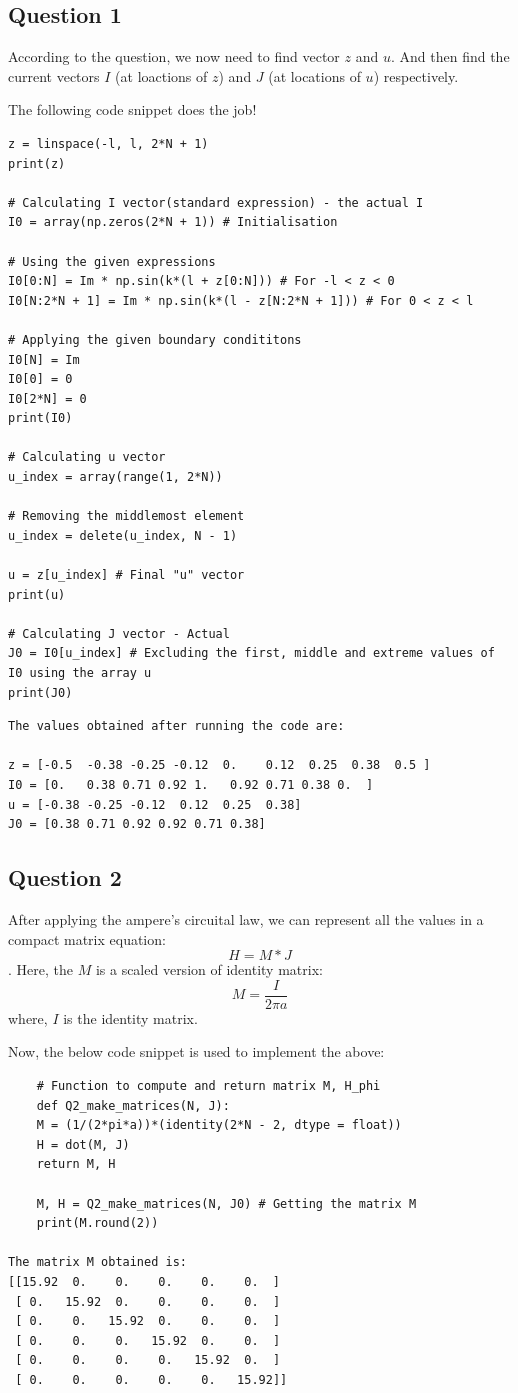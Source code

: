\documentclass{article}
\begin{document}
\subsection{Question 1}
According to the question, we now need to find vector $z$ and $u$. And then find the current vectors $I$ (at loactions of $z$) and $J$ (at locations of $u$) respectively.

\newline The following code snippet does the job!
\begin{verbatim}
z = linspace(-l, l, 2*N + 1)
print(z)

# Calculating I vector(standard expression) - the actual I
I0 = array(np.zeros(2*N + 1)) # Initialisation

# Using the given expressions
I0[0:N] = Im * np.sin(k*(l + z[0:N])) # For -l < z < 0
I0[N:2*N + 1] = Im * np.sin(k*(l - z[N:2*N + 1])) # For 0 < z < l 

# Applying the given boundary condititons
I0[N] = Im
I0[0] = 0
I0[2*N] = 0 
print(I0)

# Calculating u vector
u_index = array(range(1, 2*N))

# Removing the middlemost element
u_index = delete(u_index, N - 1)

u = z[u_index] # Final "u" vector
print(u)

# Calculating J vector - Actual
J0 = I0[u_index] # Excluding the first, middle and extreme values of I0 using the array u
print(J0)
\end{verbatim}
\begin{verbatim}
The values obtained after running the code are:

z = [-0.5  -0.38 -0.25 -0.12  0.    0.12  0.25  0.38  0.5 ]
I0 = [0.   0.38 0.71 0.92 1.   0.92 0.71 0.38 0.  ]
u = [-0.38 -0.25 -0.12  0.12  0.25  0.38]
J0 = [0.38 0.71 0.92 0.92 0.71 0.38]

\end{verbatim}


\subsection{Question 2}
After applying the ampere's circuital law, we can represent all the values in a compact matrix equation: $$H=M*J$$ .
Here, the $M$ is a scaled version of identity matrix: $$M = \frac{I}{2\pi a}$$
where, $I$ is the identity matrix.

Now, the below code snippet is used to implement the above:

\begin{verbatim}
    # Function to compute and return matrix M, H_phi
    def Q2_make_matrices(N, J):
    M = (1/(2*pi*a))*(identity(2*N - 2, dtype = float))
    H = dot(M, J)    
    return M, H     

    M, H = Q2_make_matrices(N, J0) # Getting the matrix M
    print(M.round(2)) 
    
The matrix M obtained is: 
[[15.92  0.    0.    0.    0.    0.  ]
 [ 0.   15.92  0.    0.    0.    0.  ]
 [ 0.    0.   15.92  0.    0.    0.  ]
 [ 0.    0.    0.   15.92  0.    0.  ]
 [ 0.    0.    0.    0.   15.92  0.  ]
 [ 0.    0.    0.    0.    0.   15.92]]
\end{verbatim}
\end{document}
